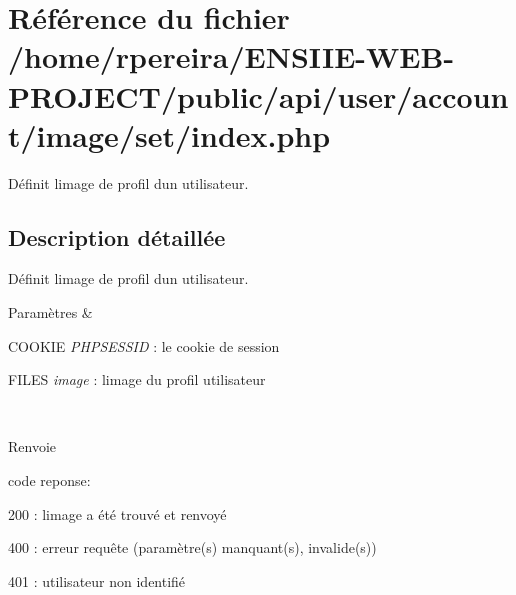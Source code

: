 \hypertarget{account_2image_2set_2index_8php}{}\section{Référence du fichier /home/rpereira/\+E\+N\+S\+I\+I\+E-\/\+W\+E\+B-\/\+P\+R\+O\+J\+E\+C\+T/public/api/user/account/image/set/index.php}
\label{account_2image_2set_2index_8php}


Définit l\textquotesingle{}image de profil d\textquotesingle{}un utilisateur.  




\subsection{Description détaillée}
Définit l\textquotesingle{}image de profil d\textquotesingle{}un utilisateur. 


\begin{DoxyParams}{Paramètres}
{\em } & 
\begin{DoxyItemize}
\item C\+O\+O\+K\+IE {\itshape P\+H\+P\+S\+E\+S\+S\+ID} \+: le cookie de session
\item F\+I\+L\+ES {\itshape image} \+: l\textquotesingle{}image du profil utilisateur 
\end{DoxyItemize}\\
\hline
\end{DoxyParams}
\begin{DoxyReturn}{Renvoie}

\begin{DoxyItemize}
\item code reponse\+:
\begin{DoxyItemize}
\item 200 \+: l\textquotesingle{}image a été trouvé et renvoyé
\item 400 \+: erreur requête (paramètre(s) manquant(s), invalide(s))
\item 401 \+: utilisateur non identifié 
\end{DoxyItemize}
\end{DoxyItemize}
\end{DoxyReturn}
